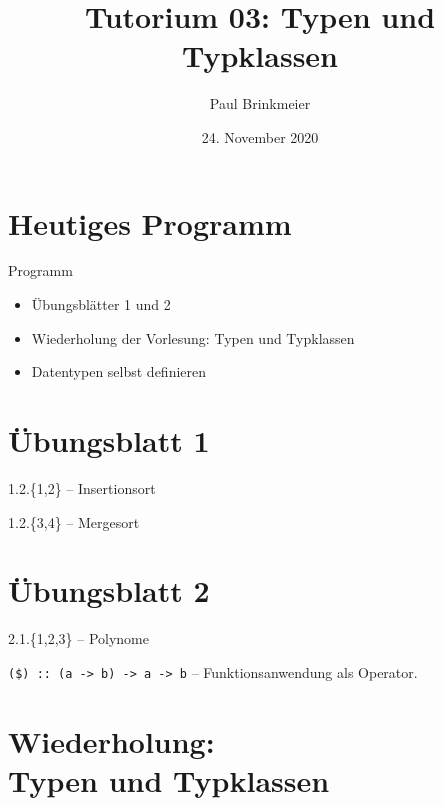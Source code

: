 \documentclass{beamer}
\title{Tutorium 03: Typen und Typklassen}
\author{Paul Brinkmeier}
\institute{Tutorium Programmierparadigmen am KIT}
\date{24. November 2020}
\begin{document}
\begin{frame}
	\titlepage
\end{frame}

\section{Heutiges Programm}
\begin{frame}{Programm}
	\begin{itemize}
                \item Übungsblätter 1 und 2
		\item Wiederholung der Vorlesung: Typen und Typklassen
		\item Datentypen selbst definieren
	\end{itemize}
\end{frame}

\section{Übungsblatt 1}

\begin{frame}{1.2.\{1,2\} -- Insertionsort}
\end{frame}

\begin{frame}{1.2.\{3,4\} -- Mergesort}
\end{frame}

\section{Übungsblatt 2}

\begin{frame}{2.1.\{1,2,3\} -- Polynome}

  \texttt{(\$) :: (a -> b) -> a -> b} -- Funktionsanwendung als Operator.
\end{frame}

\section{Wiederholung:\\Typen und Typklassen}
\end{document}
